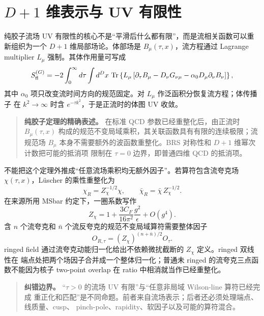 \section{\texorpdfstring{\(D+1\) 维表示与 UV 有限性}{D+1 维表示与 UV 有限性}}

纯胶子流场 UV 有限性的核心不是“平滑后什么都有限”，而是流相关函数可以重新组织为一个
\(D+1\) 维局部场论。体部场是 \(B_\mu(\tau,x)\)，流方程通过 Lagrange multiplier
\(L_\mu\) 强制。其体作用量可写成
\begin{equation}
  S^{(G)}_{\rm fl}
  =-2\int_0^\infty d\tau\int d^D x\,
  \operatorname{Tr}\left\{
  L_\mu\left[
  \partial_\tau B_\mu-D_\nu G_{\nu\mu}
  -\alpha_0D_\mu\partial_\nu B_\nu
  \right]\right\},
  \label{eq:b06-dplus1-action}
\end{equation}
其中 \(\alpha_0\) 项只改变流时间方向的规范固定。对 \(L_\mu\) 作泛函积分恢复流方程；体传播子
在 \(k^2\to\infty\) 时含 \(e^{-\tau k^2}\)，于是正流时的体图 UV 收敛。

\begin{quote}
\textbf{纯胶子定理的精确表述。} 在标准 QCD 参数已经重整化后，由正流时
\(B_\mu(\tau,x)\) 构成的规范不变局域乘积，其关联函数具有有限的连续极限；流规范场
\(B_\mu\) 本身不需要额外的波函数重整化。BRS 对称性和 \(D+1\) 维幂次计数把可能的抵消项
限制在 \(\tau=0\) 边界，即普通四维 QCD 的抵消项。
\end{quote}

不能把这个定理外推成“任意流场乘积均无额外因子”。若算符包含流夸克场
\(\chi(\tau,x)\)，Lüscher 的乘性重整化为
\begin{equation}
  \chi_R=Z_\chi^{-1/2}\chi,
  \qquad
  \bar\chi_R=\bar\chi\,Z_\chi^{-1/2}.
  \label{eq:b06-zchi-definition}
\end{equation}
在来源所用 MSbar 约定下，一圈系数写作
\begin{equation}
  Z_\chi
  =1+\frac{3C_F}{16\pi^2}\frac{g^2}{\epsilon}
  +O(g^4).
  \label{eq:b06-zchi-oneloop}
\end{equation}
含 \(n\) 个流夸克和 \(\bar n\) 个流反夸克的规范不变局域算符需要整体因子
\begin{equation}
  O_{R,\tau}
  =(Z_\chi)^{(n+\bar n)/2}O_\tau .
  \label{eq:b06-zchi-operator}
\end{equation}
ringed field 通过流夸克动能归一化给出不依赖微扰截断的 \(Z_\chi\) 定义。ringed 双线性在
端点处把两个场因子合并成一个整体归一化；普通未 ringed 的流夸克三点函数不能因为核子
two-point overlap 在 ratio 中相消就当作已经重整化。

\begin{quote}
\textbf{纠错边界。} “\(\tau>0\) 的流场 UV 有限”与“任意非局域 Wilson-line 算符已经完成
重正化和匹配”是不同命题。前者来自流场表示；后者还必须处理端点、线质量、cusp、
pinch-pole、rapidity、软因子以及可能的算符混合。
\end{quote}

